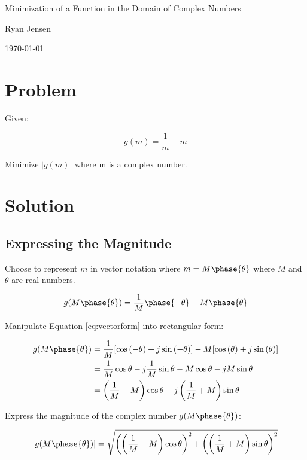 \documentclass[11pt]{article}
\begin{document}
	
	\begin{center}
		Minimization of a Function in the Domain of Complex Numbers
		
		Ryan Jensen
		
		\today
	\end{center}
	
	\section{Problem}
	
	Given:
	
	\begin{equation}
	g(m) = \frac{1}{m} - m
	\end{equation}
	
	Minimize $|g(m)|$ where m is a complex number.
	
	\section{Solution}
	
	\subsection{Expressing the Magnitude}
	
	Choose to represent $m$ in vector notation where $m = M\phase{\theta}$ where $M$ and $\theta$ are real numbers.
	
	\begin{equation}
		\label{eq:vectorform}
		g(M\phase{\theta}) = \frac{1}{M}\phase{-\theta} - M\phase{\theta}
	\end{equation}
	
	Manipulate Equation \ref{eq:vectorform} into rectangular form:
	
	\begin{align*}
		g(M\phase{\theta}) &= \frac{1}{M}[\cos{(-\theta)} + j\sin{(-\theta)}] - M[\cos{(\theta)} + j\sin{(\theta)}] \\
		&= \frac{1}{M}\cos{\theta} - j\frac{1}{M}\sin{\theta} - M\cos{\theta} - jM\sin{\theta} \\
		&= \left(\frac{1}{M}-M\right)\cos{\theta} - j\left(\frac{1}{M} + M\right)\sin{\theta}
	\end{align*}
	
	Express the magnitude of the complex number $g(M\phase{\theta})$:
	
	\begin{equation}
		|g(M\phase{\theta})| = \sqrt{\left(\left(\frac{1}{M}-M\right)\cos{\theta}\right)^2+\left(\left(\frac{1}{M} + M\right)\sin{\theta}\right)^2}
	\end{equation}
	
\end{document}
